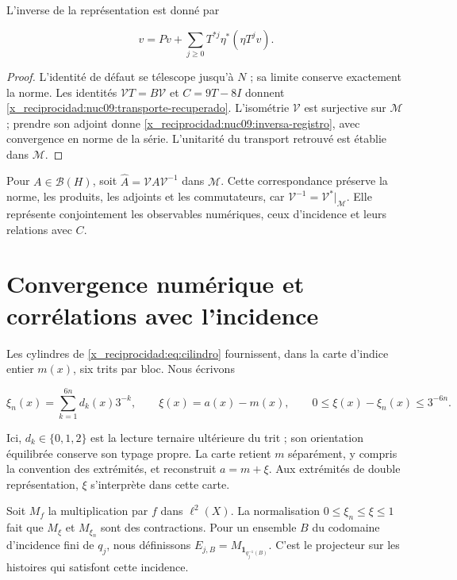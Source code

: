 L’inverse de la représentation est donné par



\begin{equation}
v=Pv+\sum_{j\ge0}T^{*j}\eta^*(\eta T^jv).
\label{x_reciprocidad:nuc09:inversa-registro}
\end{equation}



\begin{proof}
L’identité de défaut se télescope jusqu’à \(N\) ; sa limite conserve
exactement la norme. Les identités
\(\mathcal VT=B\mathcal V\) et \(C=9T-8I\) donnent
\eqref{x_reciprocidad:nuc09:transporte-recuperado}.
L’isométrie \(\mathcal V\) est surjective sur \(\mathcal M\) ;
prendre son adjoint donne \eqref{x_reciprocidad:nuc09:inversa-registro}, avec convergence
en norme de la série. L’unitarité du transport retrouvé
est établie dans \(\mathcal M\).
\end{proof}

Pour \(A\in\mathcal B(H)\), soit
\(\widehat A=\mathcal VA\mathcal V^{-1}\) dans \(\mathcal M\).
Cette correspondance préserve la norme, les produits, les adjoints et les commutateurs,
car \(\mathcal V^{-1}=\mathcal V^*|_{\mathcal M}\).
Elle représente conjointement les observables numériques, ceux d’incidence
et leurs relations avec \(C\).

\section{Convergence numérique et corrélations avec l’incidence}

Les cylindres de \eqref{x_reciprocidad:eq:cilindro} fournissent, dans la carte
d’indice entier \(m(x)\), six trits par bloc. Nous écrivons




\[
\xi_n(x)=\sum_{k=1}^{6n}d_k(x)3^{-k},\qquad
\xi(x)=a(x)-m(x),\qquad 0\le\xi(x)-\xi_n(x)\le3^{-6n}.
\]



Ici, \(d_k\in\{0,1,2\}\) est la lecture ternaire ultérieure du trit ;
son orientation équilibrée conserve son typage propre. La carte
retient \(m\) séparément, y compris la convention des extrémités,
et reconstruit \(a=m+\xi\). Aux extrémités de double représentation,
\(\xi\) s’interprète dans cette carte.


Soit \(M_f\) la multiplication par \(f\) dans \(\ell^2(X)\).
La normalisation \(0\le\xi_n\le\xi\le1\) fait que
\(M_\xi\) et \(M_{\xi_n}\) sont des contractions.
Pour un ensemble \(B\) du codomaine d’incidence fini de \(q_j\),
nous définissons
\(E_{j,B}=M_{\mathbf1_{q_j^{-1}(B)}}\).
C’est le projecteur sur les histoires qui satisfont cette incidence.

